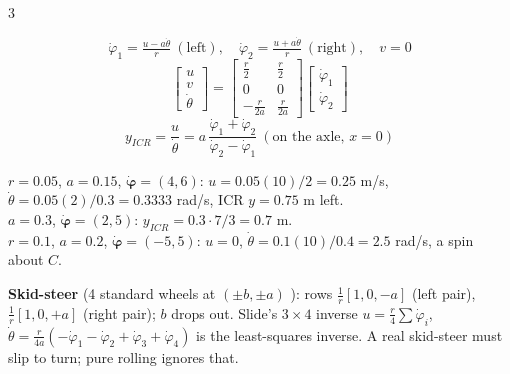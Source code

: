 \begin{multicols}{3}
\columnbreak
{}
\begin{fbx}[Two fixed wheels at $(0,\pm a)$, left $=+a$ \pg{44--47}]
\[\dot\varphi_1=\tfrac{u-a\dot\theta}{r}\ (\text{left}),\quad\dot\varphi_2=\tfrac{u+a\dot\theta}{r}\ (\text{right}),\quad v=0\]
\[\begin{bmatrix}u\\v\\\dot\theta\end{bmatrix}=\begin{bmatrix}\tfrac r2&\tfrac r2\\0&0\\-\tfrac r{2a}&\tfrac r{2a}\end{bmatrix}\begin{bmatrix}\dot\varphi_1\\\dot\varphi_2\end{bmatrix}\]
\[y_{ICR}=\frac u{\dot\theta}=a\,\frac{\dot\varphi_1+\dot\varphi_2}{\dot\varphi_2-\dot\varphi_1}\ (\text{on the axle, }x=0)\]
\end{fbx}
\begin{worked}
$r=0.05$, $a=0.15$, $\dot{\boldsymbol\varphi}=(4,6)$: $u=0.05(10)/2=0.25$ m/s, $\dot\theta=0.05(2)/0.3=0.3333$ rad/s, ICR $y=0.75$ m left. \chk\\
$a=0.3$, $\dot{\boldsymbol\varphi}=(2,5)$: $y_{ICR}=0.3\cdot7/3=0.7$ m. \chk\\
$r=0.1$, $a=0.2$, $\dot{\boldsymbol\varphi}=(-5,5)$: $u=0$, $\dot\theta=0.1(10)/0.4=2.5$ rad/s, a spin about $C$.
\end{worked}
\textbf{Skid-steer} (4 standard wheels at $(\pm b,\pm a)$ ): rows $\tfrac1r[1,0,-a]$ (left pair), $\tfrac1r[1,0,+a]$ (right pair); $b$ drops out. Slide's $3\times4$ inverse $u=\tfrac r4\sum\dot\varphi_i$, $\dot\theta=\tfrac r{4a}(-\dot\varphi_1-\dot\varphi_2+\dot\varphi_3+\dot\varphi_4)$ is the least-squares inverse. A real skid-steer must slip to turn; pure rolling ignores that.


\end{multicols}
